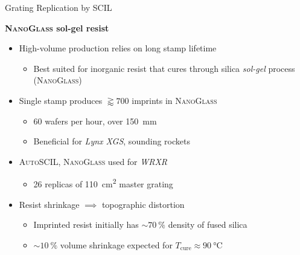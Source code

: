 \documentclass[aspectratio=169,9pt]{beamer}
\begin{document}
\begin{frame}{Grating Replication by SCIL}
 \begin{minipage}[t]{0.55\linewidth}
 \textbf{\textsc{NanoGlass} sol-gel resist}
 \begin{itemize}
  \item High-volume production relies on long stamp lifetime
  \begin{itemize}
    \item[$\square$] Best suited for inorganic resist that cures through silica \emph{sol-gel} process (\textsc{NanoGlass})
  \end{itemize}
  \item Single stamp produces $\gtrapprox \num{700}$ imprints in \textsc{NanoGlass} %
  \begin{itemize}
    \item[$\square$] 60 wafers per hour, over \SI{150}{\mm}
    \item[$\square$] Beneficial for \emph{Lynx XGS}, sounding rockets
  \end{itemize}
  \item \textsc{AutoSCIL}, \textsc{NanoGlass} used for \emph{WRXR}%
  \begin{itemize}
    \item[$\square$] 26 replicas of \SI{110}{\cm\squared} master grating %
  \end{itemize}
  \item Resist shrinkage $\implies$ topographic distortion
  \begin{itemize}
    \item[$\square$] Imprinted resist initially has $\sim \SI{70}{\percent}$ density of fused silica
    \item[$\square$] $\sim \SI{10}{\percent}$ volume shrinkage expected for $T_{\text{cure}} \approx \SI{90}{\celsius}$
  \end{itemize}
 \end{itemize}

\end{minipage}
\end{frame}
\end{document}
